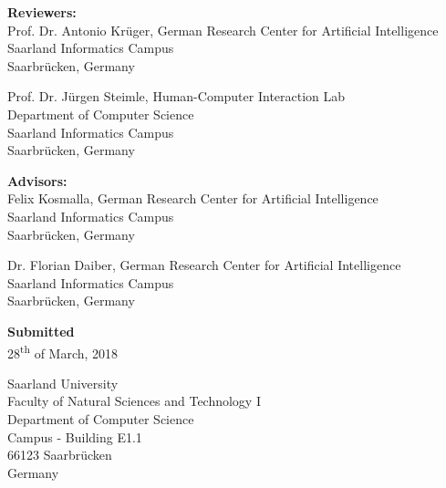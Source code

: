 \pagestyle{empty}

\vspace*{0.5cm}
\textbf{Reviewers:}\\
Prof. Dr. Antonio Krüger, German Research Center for Artificial Intelligence\\
Saarland Informatics Campus\\
Saarbrücken, Germany

\vspace*{0.5cm}
Prof. Dr. Jürgen Steimle, Human-Computer Interaction Lab\\
Department of Computer Science\\
Saarland Informatics Campus\\
Saarbrücken, Germany

\vspace*{1.5cm}
\textbf{Advisors:}\\
Felix Kosmalla, German Research Center for Artificial Intelligence\\
Saarland Informatics Campus\\
Saarbrücken, Germany

\vspace*{0.5cm}
Dr. Florian Daiber, German Research Center for Artificial Intelligence\\
Saarland Informatics Campus\\
Saarbrücken, Germany


\vspace{2cm}
\textbf{Submitted}\\
28\textsuperscript{th} of March, 2018

\vspace{2cm}
Saarland University\\
Faculty of Natural Sciences and Technology I\\
Department of Computer Science\\
Campus - Building E1.1\\
66123 Saarbrücken\\
Germany\\


